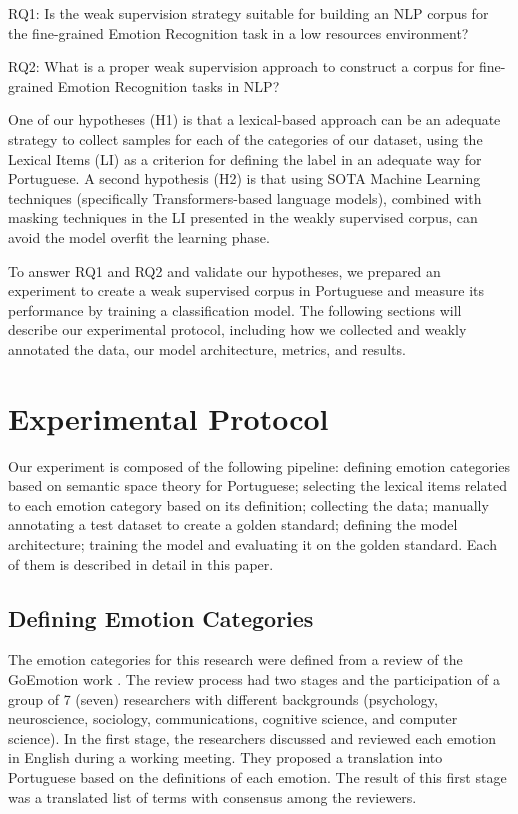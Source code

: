 \documentclass[12pt]{article}
\begin{document}
\noindent
RQ1: Is the weak supervision strategy suitable for building an NLP corpus for the fine-grained Emotion Recognition task in a low resources environment?

\noindent
RQ2: What is a proper weak supervision approach to construct a corpus for fine-grained Emotion Recognition tasks in NLP?

One of our hypotheses (H1) is that a lexical-based approach can be an adequate strategy to collect samples for each of the categories of our dataset, using the Lexical Items (LI) as a criterion for defining the label in an adequate way for Portuguese. A second hypothesis (H2) is that using SOTA Machine Learning techniques (specifically Transformers-based language models), combined with masking techniques in the LI presented in the weakly supervised corpus, can avoid the model overfit the learning phase.

To answer RQ1 and RQ2 and validate our hypotheses, we prepared an experiment to create a weak supervised corpus in Portuguese and measure its performance by training a classification model. The following sections will describe our experimental protocol, including how we collected and weakly annotated the data, our model architecture, metrics, and results.

\section{Experimental Protocol}
\label{sec:experimental-protocol}

Our experiment is composed of the following pipeline: defining emotion categories based on semantic space theory for Portuguese; selecting the lexical items related to each emotion category based on its definition; collecting the data; manually annotating a test dataset to create a golden standard; defining the model architecture; training the model and evaluating it on the golden standard. Each of them is described in detail in this paper.

\subsection{Defining Emotion Categories}

The emotion categories for this research were defined from a review of the GoEmotion work \cite{Demszky2020}. The review process had two stages and the participation of a group of 7 (seven) researchers with different backgrounds (psychology, neuroscience, sociology, communications, cognitive science, and computer science). In the first stage,  the researchers discussed and reviewed each emotion in English during a working meeting. They proposed a translation into Portuguese based on the definitions of each emotion. The result of this first stage was a translated list of terms with consensus among the reviewers.
\end{document}
